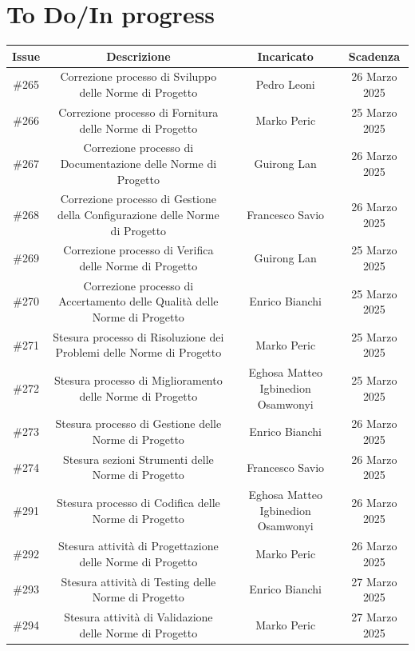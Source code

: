 \documentclass[a4paper, 12pt]{article}
\begin{document}
\section{To Do/In progress}
\begin{tabularx}{\textwidth}{|c|C|C|C|}
    \hline
        \textbf{Issue} & \textbf{Descrizione} & \textbf{Incaricato} & \textbf{Scadenza}\\
    \hline
        \#265 & Correzione processo di Sviluppo delle Norme di Progetto & Pedro Leoni & 26 Marzo 2025 \\ 
    \hline
        \#266 & Correzione processo di Fornitura delle Norme di Progetto & Marko Peric & 25 Marzo 2025 \\ 
    \hline 
        \#267 & Correzione processo di Documentazione delle Norme di Progetto & Guirong Lan  & 26 Marzo 2025 \\ 
    \hline 
        \#268 & Correzione processo di Gestione della Configurazione delle Norme di Progetto & Francesco Savio & 26 Marzo 2025 \\ 
    \hline
        \#269 & Correzione processo di Verifica delle Norme di Progetto & Guirong Lan & 25 Marzo 2025 \\ 
    \hline
        \#270 & Correzione processo di Accertamento delle Qualità delle Norme di Progetto & Enrico Bianchi & 25 Marzo 2025 \\ 
    \hline
        \#271 & Stesura processo di Risoluzione dei Problemi delle Norme di Progetto & Marko Peric & 25 Marzo 2025 \\ 
    \hline
        \#272 & Stesura processo di Miglioramento delle Norme di Progetto & Eghosa Matteo Igbinedion Osamwonyi & 25 Marzo 2025 \\ 
    \hline
        \#273 & Stesura processo di Gestione delle Norme di Progetto & Enrico Bianchi & 26 Marzo 2025 \\ 
    \hline
        \#274 & Stesura sezioni Strumenti delle Norme di Progetto & Francesco Savio & 26 Marzo 2025 \\ 
    \hline
        \#291 & Stesura processo di Codifica delle Norme di Progetto & Eghosa Matteo Igbinedion Osamwonyi & 26 Marzo 2025 \\ 
    \hline
        \#292 & Stesura attività di Progettazione delle Norme di Progetto & Marko Peric & 26 Marzo 2025 \\ 
    \hline
        \#293 & Stesura attività di Testing delle Norme di Progetto & Enrico Bianchi & 27 Marzo 2025 \\ 
    \hline
        \#294 & Stesura attività di Validazione delle Norme di Progetto & Marko Peric & 27 Marzo 2025 \\ 

\end{tabularx}
\end{document}
